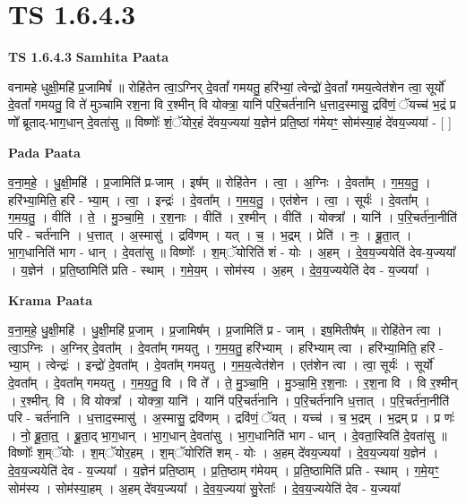 \documentclass[17pt]{extarticle}
\begin{document}
\section{ TS 1.6.4.3 }

\textbf{TS 1.6.4.3 } \newline
\textbf{Samhita Paata} \newline

वनामहे धुक्षी॒महि॑ प्र॒जामिषं᳚ ॥ रोहि॑तेन त्वा॒ऽग्निर् दे॒वतां᳚ गमयतु॒ हरि॑भ्यां॒ त्वेन्द्रो॑ दे॒वतां᳚ गमय॒त्वेत॑शेन त्वा॒ सूर्यो॑ दे॒वतां᳚ गमयतु॒ वि ते॑ मुञ्चामि रश॒ना वि र॒श्मीन् वि योक्त्रा॒ यानि॑ परि॒चर्त॑नानि ध॒त्ताद॒स्मासु॒ द्रवि॑णं॒ ॅयच्च॑ भ॒द्रं प्र णो᳚ ब्रूताद्-भाग॒धान् दे॒वता॑सु ॥ विष्णोः᳚ शं॒ॅयोर॒हं दे॑वय॒ज्यया॑ य॒ज्ञेन॑ प्रति॒ष्ठां ग॑मेयꣳ॒॒ सोम॑स्या॒हं दे॑वय॒ज्यया॑ - [ ] \newline

\textbf{Pada Paata} \newline

व॒ना॒म॒हे॒ । धु॒क्षी॒महि॑ । प्र॒जामिति॑ प्र-जाम् । इष᳚म् ॥ रोहि॑तेन । त्वा॒ । अ॒ग्निः । दे॒वता᳚म् । ग॒म॒य॒तु॒ । हरि॑भ्या॒मिति॒ हरि॑ - भ्या॒म् । त्वा॒ । इन्द्रः॑ । दे॒वता᳚म् । ग॒म॒य॒तु॒ । एत॑शेन । त्वा॒ । सूर्यः॑ । दे॒वता᳚म् । ग॒म॒य॒तु॒ । वीति॑ । ते॒ । मु॒ञ्चा॒मि॒ । र॒श॒नाः । वीति॑ । र॒श्मीन् । वीति॑ । योक्त्रा᳚ । यानि॑ । प॒रि॒चर्त॑ना॒नीति॑ परि - चर्त॑नानि । ध॒त्तात् । अ॒स्मासु॑ । द्रवि॑णम् । यत् । च॒ । भ॒द्रम् । प्रेति॑ । नः॒ । ब्रू॒ता॒त् । भा॒ग॒धानिति॑ भाग - धान् । दे॒वता॑सु ॥ विष्णोः᳚ । श॒म्ॅयोरिति॑ शं - योः । अ॒हम् । दे॒व॒य॒ज्ययेति॑ देव-य॒ज्यया᳚ । य॒ज्ञेन॑ । प्र॒ति॒ष्ठामिति॑ प्रति - स्थाम् । ग॒मे॒य॒म् । सोम॑स्य । अ॒हम् । दे॒व॒य॒ज्ययेति॑ देव - य॒ज्यया᳚ ।  \newline


\textbf{Krama Paata} \newline

व॒ना॒म॒हे॒ धु॒क्षी॒महि॑ । धु॒क्षी॒महि॑ प्र॒जाम् । प्र॒जामिष᳚म् । प्र॒जामिति॑ प्र - जाम् । इष॒मितीष᳚म् ॥ रोहि॑तेन त्वा । त्वा॒ऽग्निः । अ॒ग्निर् दे॒वता᳚म् । दे॒वता᳚म् गमयतु । ग॒म॒य॒तु॒ हरि॑भ्याम् । हरि॑भ्याम् त्वा । हरि॑भ्या॒मिति॒ हरि॑ - भ्या॒म् । त्वेन्द्रः॑ । इन्द्रो॑ दे॒वता᳚म् । दे॒वता᳚म् गमयतु । ग॒म॒य॒त्वेत॑शेन । एत॑शेन त्वा । त्वा॒ सूर्यः॑ । सूर्यो॑ दे॒वता᳚म् । दे॒वता᳚म् गमयतु । ग॒म॒य॒तु॒ वि । वि ते᳚ । ते॒ मु॒ञ्चा॒मि॒ । मु॒ञ्चा॒मि॒ र॒श॒नाः । र॒श॒ना वि । वि र॒श्मीन् । र॒श्मीन्. वि । वि योक्त्रा᳚ । योक्त्रा॒ यानि॑ । यानि॑ परि॒चर्त॑नानि । प॒रि॒चर्त॑नानि ध॒त्तात् । प॒रि॒चर्त॑ना॒नीति॑ परि - चर्त॑नानि । ध॒त्ताद॒स्मासु॑ । अ॒स्मासु॒ द्रवि॑णम् । द्रवि॑णं॒ ॅयत् । यच्च॑ । च॒ भ॒द्रम् । भ॒द्रम् प्र । प्र णः॑ । नो॒ ब्रू॒ता॒त्॒ । ब्रू॒ता॒द् भा॒ग॒धान् । भा॒ग॒धान् दे॒वता॑सु । भा॒ग॒धानिति॑ भाग - धान् । दे॒वता॒स्विति॑ दे॒वता॑सु ॥ विष्णोः᳚ श॒म्ॅयोः । श॒म्ॅयोर॒हम् । श॒म्ॅयोरिति॑ शम् - योः । अ॒हम् दे॑वय॒ज्यया᳚ । दे॒व॒य॒ज्यया॑ य॒ज्ञेन॑ । दे॒व॒य॒ज्ययेति॑ देव - य॒ज्यया᳚ । य॒ज्ञेन॑ प्रति॒ष्ठाम् । प्र॒ति॒ष्ठाम् ग॑मेयम् । प्र॒ति॒ष्ठामिति॑ प्रति - स्थाम् । ग॒मे॒यꣳ॒॒ सोम॑स्य । सोम॑स्या॒हम् । अ॒हम् दे॑वय॒ज्यया᳚ । दे॒व॒य॒ज्यया॑ सु॒रेताः᳚ । दे॒व॒य॒ज्ययेति॑ देव - य॒ज्यया᳚ \newline
\end{document}
